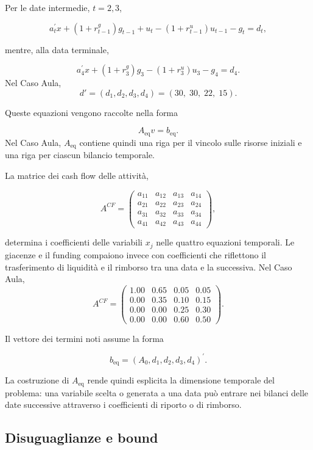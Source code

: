 Per le date intermedie, $t=2,3$,

\[
a_t^{\prime}x
+
(1+r_{t-1}^{g})g_{t-1}
+
u_t
-
(1+r_{t-1}^{u})u_{t-1}
-
g_t
=
d_t,
\]

\noindent mentre, alla data terminale,

\[
a_4^{\prime}x
+
(1+r_3^{g})g_3
-
(1+r_3^{u})u_3
-
g_4
=
d_4.
\]
Nel Caso Aula,
\[
d'=(d_1,d_2,d_3,d_4)=(30,\;30,\;22,\;15).
\]

Queste equazioni vengono raccolte nella forma

\[
A_{\mathrm{eq}}v=b_{\mathrm{eq}}.
\]
Nel Caso Aula, $A_{\mathrm{eq}}$ contiene quindi una riga per il vincolo sulle
risorse iniziali e una riga per ciascun bilancio temporale.

La matrice dei cash flow delle attivit\`a,

\[
A^{CF}
=
\begin{pmatrix}
a_{11} & a_{12} & a_{13} & a_{14}\\
a_{21} & a_{22} & a_{23} & a_{24}\\
a_{31} & a_{32} & a_{33} & a_{34}\\
a_{41} & a_{42} & a_{43} & a_{44}
\end{pmatrix}
,
\]

\noindent determina i coefficienti delle variabili $x_j$ nelle quattro equazioni
temporali. Le giacenze e il funding compaiono invece con coefficienti che
riflettono il trasferimento di liquidit\`a e il rimborso tra una data e la
successiva. Nel Caso Aula,
\[
A^{CF}
=
\begin{pmatrix}
1.00 & 0.65 & 0.05 & 0.05\\
0.00 & 0.35 & 0.10 & 0.15\\
0.00 & 0.00 & 0.25 & 0.30\\
0.00 & 0.00 & 0.60 & 0.50
\end{pmatrix}.
\]

Il vettore dei termini noti assume la forma

\[
b_{\mathrm{eq}}
=
\left(
A_0,
d_1,
d_2,
d_3,
d_4
\right)^{\prime}.
\]

La costruzione di $A_{\mathrm{eq}}$ rende quindi esplicita la dimensione
temporale del problema: una variabile scelta o generata a una data pu\`o
entrare nei bilanci delle date successive attraverso i coefficienti di
riporto o di rimborso.

\subsection{Disuguaglianze e bound}

